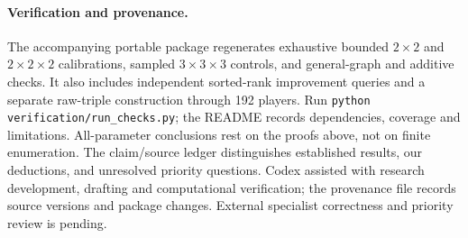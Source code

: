 \documentclass[11pt]{article}
\begin{document}
\paragraph{Verification and provenance.}
The accompanying portable package regenerates exhaustive bounded
$2\times2$ and $2\times2\times2$ calibrations, sampled
$3\times3\times3$ controls, and general-graph and additive checks.
It also includes independent sorted-rank improvement queries and a separate
raw-triple construction through 192 players. Run
\texttt{python verification/run\_checks.py}; the README records dependencies,
coverage and limitations. All-parameter conclusions rest on the proofs above,
not on finite enumeration. The claim/source ledger distinguishes established
results, our deductions, and unresolved priority questions. Codex assisted
with research development, drafting and computational verification; the
provenance file records source versions and package changes.
External specialist correctness and priority review is pending.
\end{document}
